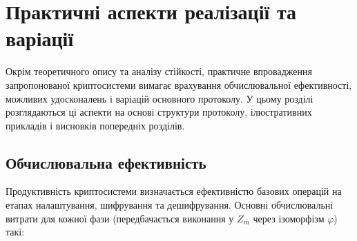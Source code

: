 \section{Практичні аспекти реалізації та варіації}
\label{sec:implementation_considerations}
Окрім теоретичного опису та аналізу стійкості, практичне впровадження запропонованої криптосистеми вимагає врахування обчислювальної ефективності, можливих удосконалень і варіацій основного протоколу.
У цьому розділі розглядаються ці аспекти на основі структури протоколу, ілюстративних прикладів і висновків попередніх розділів.

\subsection{Обчислювальна ефективність}
\label{subsec:computational_efficiency}
Продуктивність криптосистеми визначається ефективністю базових операцій на етапах налаштування, шифрування та дешифрування.
Основні обчислювальні витрати для кожної фази (передбачається виконання у $Z_m$ через ізоморфізм $\varphi$) такі:

